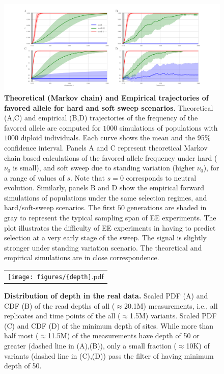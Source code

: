 \begin{figure}[H]
	\includegraphics[trim=1in 0.1in 1in 
	0.1in,clip,width=\textwidth]{figures/AF.pdf}
	\caption{{\bf Theoretical (Markov chain) and Empirical
            trajectories of favored allele for hard and soft sweep
            scenarios}.  Theoretical (A,C) and empirical (B,D) trajectories of 
            the
          frequency of the favored allele are computed for $1000$ 
          simulations of populations with 
          $1000$ diploid individuals. Each curve shows the mean and the 95\% 
          confidence
          interval.  Panels A and C represent theoretical Markov chain
          based calculations of the favored allele frequency under
          hard ($\nu_0$ is small), and soft sweep due to standing
          variation (higher $\nu_0$), for a range of values of
          $s$. Note that $s=0$ corresponds to neutral
          evolution. Similarly, panels B and D show the empirical
          forward simulations of populations under the same selection
          regimes, and hard/soft-sweep scenarios. The first $50$
          generations are shaded in gray to represent the typical
          sampling span of EE experiments. The plot illustrates the
          difficulty of EE experiments in having to predict selection
          at a very early stage of the sweep. The signal is slightly
          stronger under standing variation scenario. The theoretical
          and empirical simulations are in close correspondence. }
	\label{fig:sweep}
\end{figure}

\begin{figure}[H]
	\centering
	\begin{tabular}{c}
		\texttt{[image: figures/\{depth]}.pdf}
	\end{tabular}
	\caption{ {\bf Distribution of depth in the real data.}
		 Scaled PDF (A) and CDF (B) of the read depths of all ($\approx$20.1M) 
		 measurements, i.e., all replicates and time points of the all 
		 ($\approx$1.5M) variants.
		 Scaled PDF (C) and CDF (D) of the minimum depth of sites. While more 
		 than half 
		 most ($\approx$11.5M) of the measurements have depth of 50 or greater 
		 (dashed line in (A),(B)), only a small fraction ($\approx$10K) of 
		 variants (dashed line in (C),(D)) pass the filter of having minimum 
		 depth of 50.}  
	\label{fig:depth}
\end{figure}



